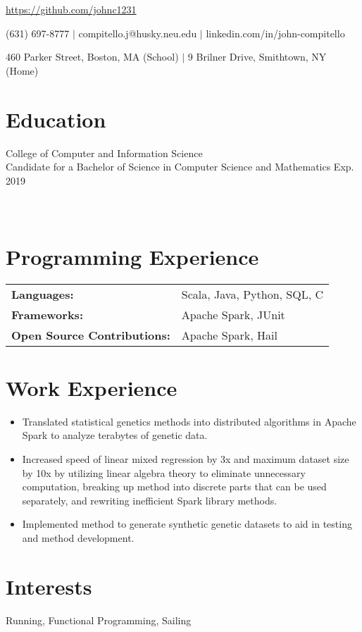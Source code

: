 \documentclass[12pt]{john_resume}
\begin{document}
\centerline{\url{https://github.com/johnc1231}}
\centerline{(631) 697-8777 $|$ compitello.j@husky.neu.edu $|$ linkedin.com/in/john-compitello}
\centerline{460 Parker Street, Boston, MA (School) $|$ 9 Brilner Drive, Smithtown, NY (Home)}

\section{Education}
College of Computer and Information Science\\
Candidate for a Bachelor of Science in Computer Science and Mathematics \hspace*{\fill} Exp. 2019 \\
 \\
 \\

\section{Programming Experience}
\begin{tabular}{l l}
\textbf{Languages:} & Scala, Java, Python, SQL, C\\
\textbf{Frameworks:} & Apache Spark, JUnit \\
\textbf{Open Source Contributions:} & Apache Spark, Hail
\end{tabular}

\section{Work Experience}

\begin{itemize}
	\item Translated statistical genetics methods into distributed algorithms in Apache Spark to analyze 
		terabytes of genetic data.
	\item Increased speed of linear mixed regression by 3x and maximum dataset size by 10x by utilizing 
		linear algebra theory to eliminate unnecessary computation, breaking up method into discrete parts 	
		that can be used separately, and rewriting inefficient Spark library methods. 
	\item Implemented method to generate synthetic genetic datasets to aid in testing and method 
		development.
\end{itemize}


\section{Interests}
Running, Functional Programming, Sailing
\end{document}
